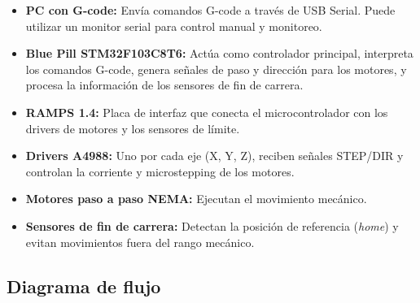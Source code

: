 \documentclass[12pt]{article}
\begin{document}
\begin{itemize}
    \item \textbf{PC con G-code:} Envía comandos G-code a través de USB Serial. Puede utilizar un monitor serial para control manual y monitoreo.
    \item \textbf{Blue Pill STM32F103C8T6:} Actúa como controlador principal, interpreta los comandos G-code, genera señales de paso y dirección para los motores, y procesa la información de los sensores de fin de carrera.
    \item \textbf{RAMPS 1.4:} Placa de interfaz que conecta el microcontrolador con los drivers de motores y los sensores de límite.
    \item \textbf{Drivers A4988:} Uno por cada eje (X, Y, Z), reciben señales STEP/DIR y controlan la corriente y microstepping de los motores.
    \item \textbf{Motores paso a paso NEMA:} Ejecutan el movimiento mecánico.
    \item \textbf{Sensores de fin de carrera:} Detectan la posición de referencia (\textit{home}) y evitan movimientos fuera del rango mecánico.
\end{itemize}

\subsection*{Diagrama de flujo}
\end{document}
